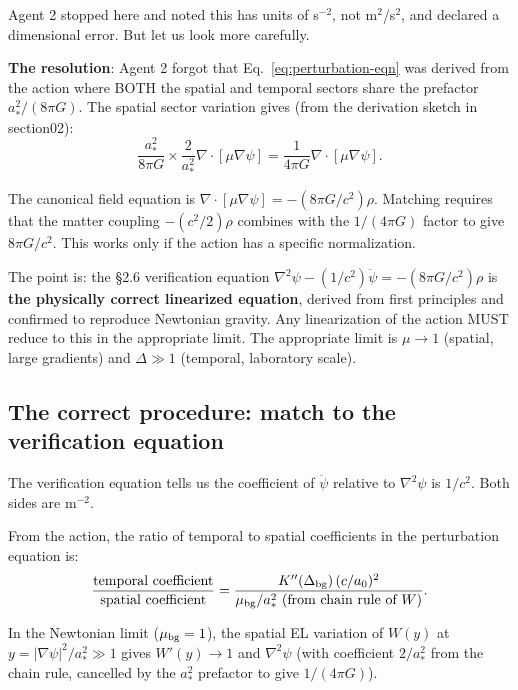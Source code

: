 \documentclass[11pt]{article}
\theoremstyle{definition}
\theoremstyle{remark}
\begin{document}
Agent 2 stopped here and noted this has units of s$^{-2}$, not m$^2$/s$^2$,
and declared a dimensional error. But let us look more carefully.

\textbf{The resolution}: Agent 2 forgot that Eq.~\eqref{eq:perturbation-eqn}
was derived from the action where BOTH the spatial and temporal sectors
share the prefactor $a_*^2/(8\pi G)$. The spatial sector variation gives
(from the derivation sketch in section02):
\begin{equation}
\frac{a_*^2}{8\pi G} \times \frac{2}{a_*^2}\nabla\cdot[\mu\nabla\psi]
= \frac{1}{4\pi G}\nabla\cdot[\mu\nabla\psi].
\end{equation}

The canonical field equation is $\nabla\cdot[\mu\nabla\psi] = -(8\pi G/c^2)\rho$.
Matching requires that the matter coupling $-(c^2/2)\rho$ combines with
the $1/(4\pi G)$ factor to give $8\pi G/c^2$. This works only if the
action has a specific normalization.

The point is: the \S2.6 verification equation
$\nabla^2\psi - (1/c^2)\ddot\psi = -(8\pi G/c^2)\rho$ is
\textbf{the physically correct linearized equation}, derived from
first principles and confirmed to reproduce Newtonian gravity.
Any linearization of the action MUST reduce to this in the appropriate
limit. The appropriate limit is $\mu \to 1$ (spatial, large gradients)
and $\Delta \gg 1$ (temporal, laboratory scale).

\subsection{The correct procedure: match to the verification equation}
\label{sec:explicit}

The verification equation tells us the coefficient of $\ddot\psi$
relative to $\nabla^2\psi$ is $1/c^2$. Both sides are m$^{-2}$.

From the action, the ratio of temporal to spatial coefficients in
the perturbation equation is:
\begin{equation}
\frac{\text{temporal coefficient}}{\text{spatial coefficient}}
= \frac{K''(\Delta_{\rm bg})\,(c/a_0)^2}{\mu_{\rm bg}/a_*^2
  \text{ (from chain rule of $W$)}}.
\end{equation}

In the Newtonian limit ($\mu_{\rm bg} = 1$), the spatial EL variation
of $W(y)$ at $y = |\nabla\psi|^2/a_*^2 \gg 1$ gives $W'(y) \to 1$
and $\nabla^2\psi$ (with coefficient $2/a_*^2$ from the chain rule,
cancelled by the $a_*^2$ prefactor to give $1/(4\pi G)$).
\end{document}
